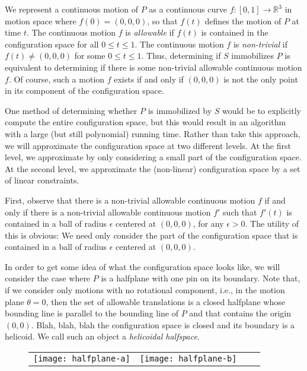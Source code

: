 \documentclass[lotsofwhite,charterfonts]{patmorin}
\begin{document}
We represent a continuous motion of $P$ as a continuous curve
$f:[0,1]\rightarrow \mathbb{R}^3$ in motion space where $f(0)=(0,0,0)$, so that
$f(t)$ defines the motion of $P$ at time $t$.  The continuous motion $f$ is
\emph{allowable} if $f(t)$ is contained in the configuration space for all
$0\le t\le 1$. The continuous motion $f$ is \emph{non-trivial} if $f(t)\neq
(0,0,0)$ for some $0\le t\le 1$.  Thus, determining if $S$ immobilizes $P$ is
equivalent to determining if there is some non-trivial allowable continuous
motion $f$.  Of course, such a motion $f$ exists if and only if $(0,0,0)$ is
not the only point in its component of the configuration space.

One method of determining whether $P$ is immobilized by $S$ would be to
explicitly compute the entire configuration space, but this would result in an
algorithm with a large (but still polynomial) running time.  Rather than take
this approach, we will approximate the configuration space at two different
levels.  At the first level, we approximate by only considering a small part of
the configuration space.  At the second level, we approximate the (non-linear)
configuration space by a set of linear constraints. 

First, observe that there is a non-trivial allowable continuous motion $f$ if
and only if there is a non-trivial allowable continuous motion $f'$ such that
$f'(t)$ is contained in a ball of radius $\epsilon$ centered at $(0,0,0)$, for
any $\epsilon >0$.  The utility of this is obvious:  We need only consider the
part of the configuration space that is contained in a ball of radius
$\epsilon$ centered at $(0,0,0)$.

In order to get some idea of what the configuration space looks like, we will
consider the case where $P$ is a halfplane with one pin on its boundary.  Note
that, if we consider only motions with no rotational component, i.e., in the
motion plane $\theta=0$, then the set of allowable translations is a closed
halfplane whose bounding line is parallel to the bounding line of $P$ and that
contains the origin $(0,0)$.  Blah, blah, blah the configuration space is
closed and its boundary is a helicoid.  We call such an object a
\emph{helicoidal halfspace}.

\begin{figure}
\begin{center}\begin{tabular}{cccc}
\texttt{[image: halfplane-a]} & \texttt{[image: halfplane-b]}
\end{tabular}\end{center}
\end{figure}
\end{document}
